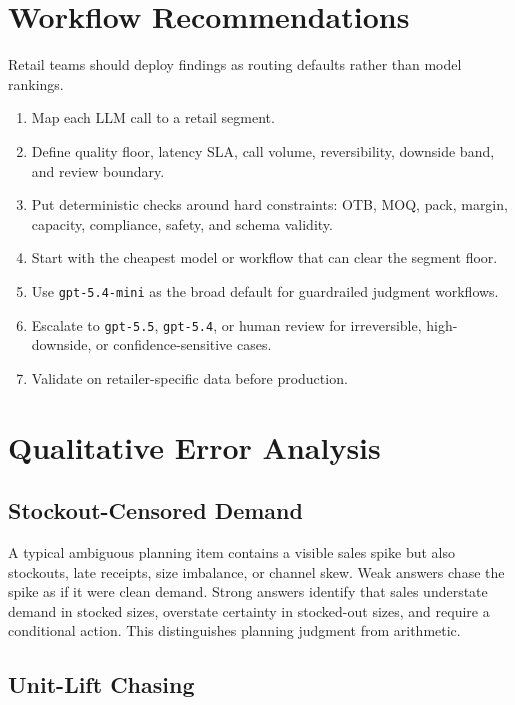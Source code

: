 \documentclass[11pt]{article}
\newcommand{\code}[1]{\texttt{#1}}
\begin{document}
\section{Workflow Recommendations}

Retail teams should deploy findings as routing defaults rather than model rankings.

\begin{enumerate}[leftmargin=*]
  \item Map each LLM call to a retail segment.
  \item Define quality floor, latency SLA, call volume, reversibility, downside band, and review boundary.
  \item Put deterministic checks around hard constraints: OTB, MOQ, pack, margin, capacity, compliance, safety, and schema validity.
  \item Start with the cheapest model or workflow that can clear the segment floor.
  \item Use \code{gpt-5.4-mini} as the broad default for guardrailed judgment workflows.
  \item Escalate to \code{gpt-5.5}, \code{gpt-5.4}, or human review for irreversible, high-downside, or confidence-sensitive cases.
  \item Validate on retailer-specific data before production.
\end{enumerate}

\section{Qualitative Error Analysis}

\subsection{Stockout-Censored Demand}

A typical ambiguous planning item contains a visible sales spike but also stockouts, late receipts, size imbalance, or channel skew. Weak answers chase the spike as if it were clean demand. Strong answers identify that sales understate demand in stocked sizes, overstate certainty in stocked-out sizes, and require a conditional action. This distinguishes planning judgment from arithmetic.

\subsection{Unit-Lift Chasing}
\end{document}
